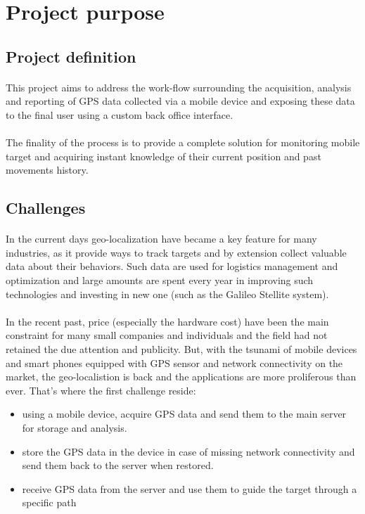 \section{Project purpose}
\subsection{Project definition}
\paragraph{}
This project aims to address the work-flow surrounding the acquisition, analysis and reporting of GPS data collected via a mobile device and exposing these data to the final user using a custom back office interface.

\paragraph{}
The finality of the process is to provide a complete solution for monitoring mobile target and acquiring instant knowledge of their current position and past movements history.

\subsection{Challenges}
\paragraph{}
In the current days geo-localization have became a key feature for many industries, as it provide ways to track targets and by extension collect valuable data about their behaviors. Such data are used for logistics management and optimization and large amounts are spent every year in improving such technologies and investing in new one (such as the Galileo Stellite system).

\paragraph{}
In the recent past, price (especially the hardware cost) have been the main constraint for many small companies and individuals and the field had not retained the due attention and publicity. But, with the tsunami of mobile devices and smart phones equipped with GPS sensor and network connectivity on the market, the geo-localistion is back and the applications are more proliferous than ever. That's where the first challenge reside:
\begin{itemize}
\item using a mobile device, acquire GPS data and send them to the main server for storage and analysis.
\item store the GPS data in the device in case of missing network connectivity and send them back to the server when restored.
\item receive GPS data from the server and use them to guide the target through a specific path
\end{itemize}

